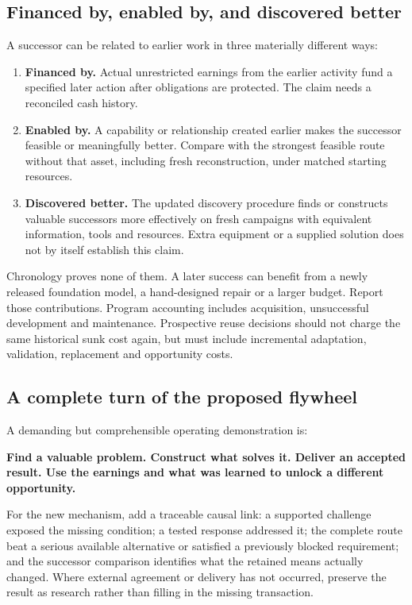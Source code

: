 \subsection{Financed by, enabled by, and discovered better}
A successor can be related to earlier work in three materially different ways:
\begin{enumerate}
\item \textbf{Financed by.} Actual unrestricted earnings from the earlier activity fund a specified later action after obligations are protected. The claim needs a reconciled cash history.
\item \textbf{Enabled by.} A capability or relationship created earlier makes the successor feasible or meaningfully better. Compare with the strongest feasible route without that asset, including fresh reconstruction, under matched starting resources.
\item \textbf{Discovered better.} The updated discovery procedure finds or constructs valuable successors more effectively on fresh campaigns with equivalent information, tools and resources. Extra equipment or a supplied solution does not by itself establish this claim.
\end{enumerate}
Chronology proves none of them. A later success can benefit from a newly released foundation model, a hand-designed repair or a larger budget. Report those contributions. Program accounting includes acquisition, unsuccessful development and maintenance. Prospective reuse decisions should not charge the same historical sunk cost again, but must include incremental adaptation, validation, replacement and opportunity costs.

\subsection{A complete turn of the proposed flywheel}
A demanding but comprehensible operating demonstration is:
\begin{thesisbox}
\textbf{Find a valuable problem. Construct what solves it. Deliver an accepted result. Use the earnings and what was learned to unlock a different opportunity.}
\end{thesisbox}
For the new mechanism, add a traceable causal link: a supported challenge exposed the missing condition; a tested response addressed it; the complete route beat a serious available alternative or satisfied a previously blocked requirement; and the successor comparison identifies what the retained means actually changed. Where external agreement or delivery has not occurred, preserve the result as research rather than filling in the missing transaction.

